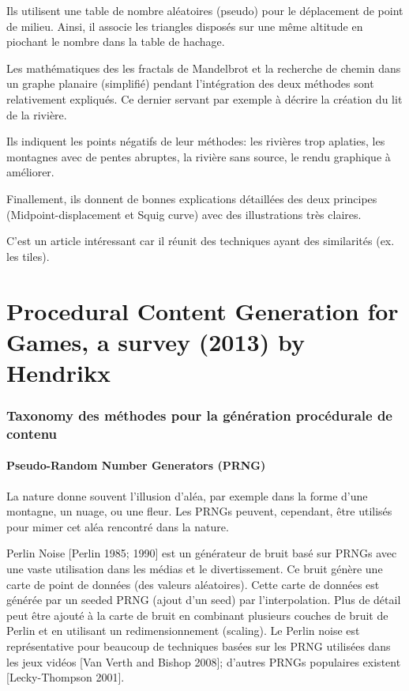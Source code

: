 \documentclass[11pt]{report}
\begin{document}
Ils utilisent une table de nombre aléatoires (pseudo) pour le déplacement de point de milieu. Ainsi, il associe les triangles disposés sur une même altitude en piochant le nombre dans la table de hachage.

Les mathématiques des les fractals de Mandelbrot et la recherche de chemin dans un graphe planaire (simplifié) pendant l'intégration des deux méthodes sont relativement expliqués. Ce dernier servant par exemple à décrire la création du lit de la rivière.

Ils indiquent les points négatifs de leur méthodes: les rivières trop aplaties, les montagnes avec de pentes abruptes, la rivière sans source, le rendu graphique à améliorer.

Finallement, ils donnent de bonnes explications détaillées des deux principes (Midpoint-displacement et Squig curve) avec des illustrations très claires.

C'est un article intéressant car il réunit des techniques ayant des similarités (ex. les tiles).

\part{Procedural Content Generation for Games, a survey (2013) by Hendrikx}

\section{Taxonomy des méthodes  pour la génération procédurale de contenu}

\subsection{Pseudo-Random Number Generators (PRNG)}

La nature donne souvent l'illusion d'aléa, par exemple dans la forme d'une montagne, un nuage, ou une fleur. Les PRNGs peuvent, cependant, être utilisés pour mimer cet aléa rencontré dans la nature.

Perlin Noise [Perlin 1985; 1990] est un générateur de bruit basé sur PRNGs avec une vaste utilisation dans les médias et le divertissement. Ce bruit génère une carte de point de données (des valeurs aléatoires). Cette carte de données est générée par un seeded PRNG (ajout d'un seed) par l'interpolation. Plus de détail peut être ajouté à la carte de bruit en combinant plusieurs couches de bruit de Perlin et en utilisant un redimensionnement (scaling). Le Perlin noise est représentative pour beaucoup de techniques basées sur les PRNG utilisées dans les jeux vidéos [Van Verth and Bishop 2008]; d'autres PRNGs populaires existent [Lecky-Thompson 2001].
\end{document}
